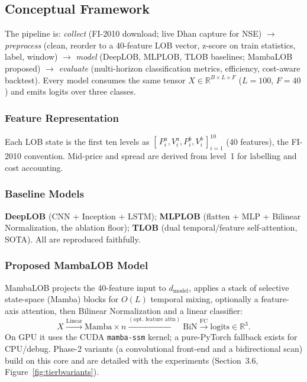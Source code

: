 \documentclass[11pt]{article}
\begin{document}
\subsection{Conceptual Framework}
The pipeline is: \emph{collect} (FI-2010 download; live Dhan capture for NSE) $\rightarrow$ \emph{preprocess}
(clean, reorder to a 40-feature LOB vector, z-score on train statistics, label, window) $\rightarrow$
\emph{model} (DeepLOB, MLPLOB, TLOB baselines; MambaLOB proposed) $\rightarrow$ \emph{evaluate}
(multi-horizon classification metrics, efficiency, cost-aware backtest). Every model consumes the same
tensor $X \in \mathbb{R}^{B \times L \times F}$ ($L=100$, $F=40$) and emits logits over three classes.

\subsubsection{Feature Representation}
Each LOB state is the first ten levels as
$[\,P^a_i, V^a_i, P^b_i, V^b_i\,]_{i=1}^{10}$ (40 features), the FI-2010 convention. Mid-price and spread
are derived from level~1 for labelling and cost accounting.

\subsubsection{Baseline Models}
\textbf{DeepLOB} (CNN + Inception + LSTM); \textbf{MLPLOB} (flatten + MLP + Bilinear Normalization, the
ablation floor); \textbf{TLOB} (dual temporal/feature self-attention, SOTA). All are reproduced faithfully.

\subsubsection{Proposed MambaLOB Model}
MambaLOB projects the 40-feature input to $d_{\mathrm{model}}$, applies a stack of selective state-space
(Mamba) blocks for $O(L)$ temporal mixing, optionally a feature-axis attention, then Bilinear Normalization
and a linear classifier:
\[
X \xrightarrow{\text{Linear}} \text{Mamba}\times n \xrightarrow{(\text{opt.\ feature attn})}
\text{BiN} \xrightarrow{\text{FC}} \text{logits}\in\mathbb{R}^{3}.
\]
On GPU it uses the CUDA \texttt{mamba-ssm} kernel; a pure-PyTorch fallback exists for CPU/debug. Phase-2
variants (a convolutional front-end and a bidirectional scan) build on this core and are detailed with the
experiments (Section~3.6, Figure~\ref{fig:tierbvariants}).
\end{document}
